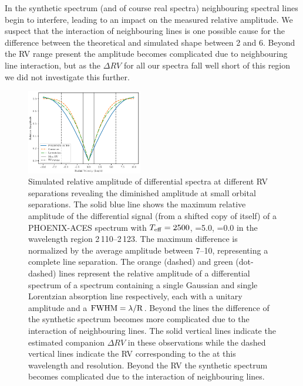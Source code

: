 In the synthetic spectrum (and of course real spectra) neighbouring spectral lines begin to interfere, leading to an impact on the measured relative amplitude. We suspect that the interaction of neighbouring lines is one possible cause for the difference between the theoretical and simulated shape between 2 and 6\kmps{}. Beyond the {RV} range present the amplitude becomes complicated due to neighbouring line interaction, but as the \(\Delta {RV}\) for all our spectra fall well short of this region we did not investigate this further.

\begin{figure}
    \centering
    \includegraphics[width=0.45\textwidth]{figures/direct-recovery/rv_diff_final.pdf}
    \caption{Simulated relative amplitude of differential spectra at different {RV} separations revealing the diminished amplitude at small orbital separations. The solid blue line shows the maximum relative amplitude of the differential signal (from a shifted copy of itself) of a {PHOENIX-ACES} spectrum with \(T_{\mathrm{eff}}{}=2500\)\K{}, \logg{}=5.0, \feh{}=0.0 in the wavelength region 2\,110--2\,123\nm{}. The maximum difference is normalized by the average amplitude between 7--10\kmps{}, representing a complete line separation. The orange (dashed) and green (dot-dashed) lines represent the relative amplitude of a differential spectrum of a spectrum containing a single Gaussian and single Lorentzian absorption line respectively, each with a unitary amplitude and a \(\rm {\textrm{FWHM}} = \lambda / R\). Beyond the {\fwhm} lines the difference of the synthetic spectrum becomes more complicated due to the interaction of neighbouring lines. The solid vertical lines indicate the estimated companion \(\Delta {RV}\) in these observations while the dashed vertical lines indicate the {RV} corresponding to the {\fwhm} at this wavelength and resolution. Beyond the {\fwhm} {RV} the synthetic spectrum becomes complicated due to the interaction of neighbouring lines.}
    \label{fig:diff_amp}
\end{figure}

